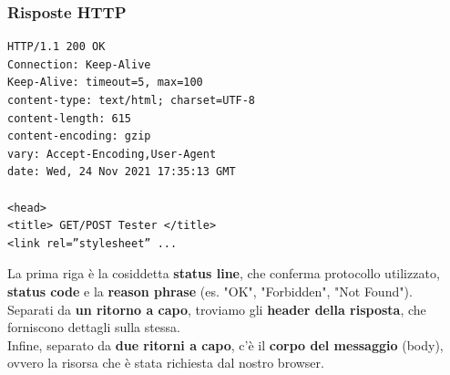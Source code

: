 \documentclass{article}
\begin{document}
\subsubsection{Risposte HTTP}
\begin{minipage}{0.50\textwidth}
\begin{verbatim}
HTTP/1.1 200 OK
Connection: Keep-Alive
Keep-Alive: timeout=5, max=100
content-type: text/html; charset=UTF-8
content-length: 615
content-encoding: gzip
vary: Accept-Encoding,User-Agent
date: Wed, 24 Nov 2021 17:35:13 GMT

<head>
<title> GET/POST Tester </title>
<link rel=”stylesheet” ...
\end{verbatim}   
\end{minipage}
\quad
\begin{minipage}{0.45\textwidth}
La prima riga è la cosiddetta \textbf{status line}, che conferma protocollo utilizzato, \textbf{status code} e la \textbf{reason phrase} (es. "OK", "Forbidden", "Not Found").\\
Separati da \textbf{un ritorno a capo}, troviamo gli \textbf{header della risposta}, che forniscono dettagli sulla stessa.\\
Infine, separato da \textbf{due ritorni a capo}, c’è il \textbf{corpo del messaggio} (body), ovvero la risorsa che è stata richiesta dal nostro browser.
\end{minipage}
\end{document}
